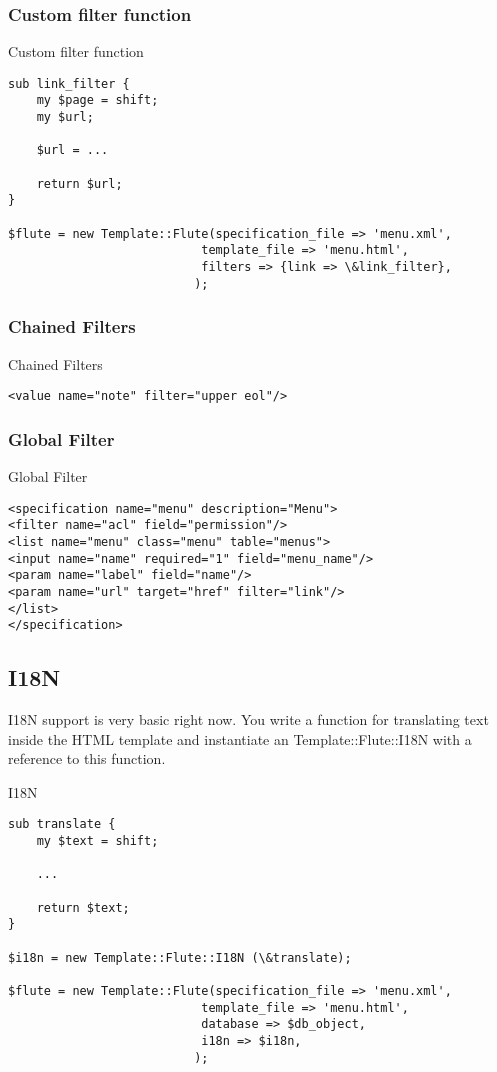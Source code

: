 \subsubsection{Custom filter function}
\begin{frame}[fragile]{Custom filter function}
\begin{lstlisting}
sub link_filter {
    my $page = shift;
    my $url;

    $url = ...
    
    return $url;
}

$flute = new Template::Flute(specification_file => 'menu.xml',
						   template_file => 'menu.html',
						   filters => {link => \&link_filter},
						  );
\end{lstlisting}
\end{frame}

\subsubsection{Chained Filters}
\begin{frame}[fragile]{Chained Filters}
\begin{lstlisting}
<value name="note" filter="upper eol"/>
\end{lstlisting}
\end{frame}

\subsubsection{Global Filter}
\begin{frame}[fragile]{Global Filter}
\begin{lstlisting}
<specification name="menu" description="Menu">
<filter name="acl" field="permission"/>
<list name="menu" class="menu" table="menus">
<input name="name" required="1" field="menu_name"/>
<param name="label" field="name"/>
<param name="url" target="href" filter="link"/>
</list>
</specification>
\end{lstlisting}
\end{frame}

\subsection{I18N}
I18N support is very basic right now. You write a function for
translating text inside the HTML template and instantiate an
Template::Flute::I18N with a reference to this function. 
\begin{frame}[fragile]{I18N}
\begin{lstlisting}
sub translate {
    my $text = shift;

    ...

    return $text;
}

$i18n = new Template::Flute::I18N (\&translate);

$flute = new Template::Flute(specification_file => 'menu.xml',
						   template_file => 'menu.html',
						   database => $db_object,
						   i18n => $i18n,
						  );
\end{lstlisting}
\end{frame}

